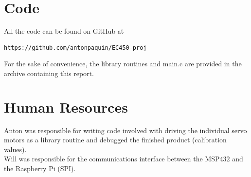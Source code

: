 \documentclass[10pt]{article}
\begin{document}
\section{Code}


All the code can be found on GitHub at 
\begin{lstlisting}
https://github.com/antonpaquin/EC450-proj
\end{lstlisting}
For the sake of convenience, the library routines and main.c are provided in the archive containing this report.

\section{Human Resources}
Anton was responsible for writing code involved with driving the individual servo motors as a library routine and debugged the finished product (calibration values).\\ \newline 
Will was responsible for the communications interface between the MSP432 and the Raspberry Pi (SPI).





\end{document}
